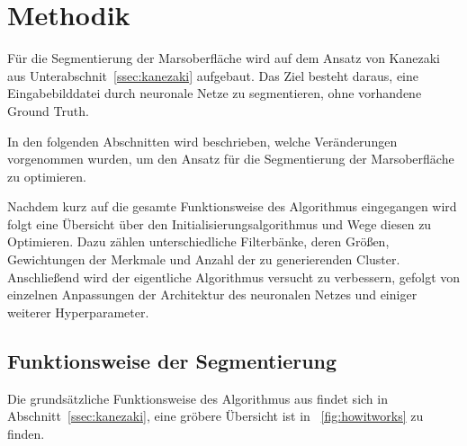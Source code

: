 \chapter{Methodik}
\label{chap:methodik}

Für die Segmentierung der Marsoberfläche wird auf dem Ansatz von Kanezaki \etal \cite{kanezaki_18} aus Unterabschnit~\ref{ssec:kanezaki} aufgebaut. Das Ziel besteht daraus, eine Eingabebilddatei durch neuronale Netze zu segmentieren, ohne vorhandene Ground Truth.

In den folgenden Abschnitten wird beschrieben, welche Veränderungen vorgenommen wurden, um den Ansatz für die Segmentierung der Marsoberfläche zu optimieren.

Nachdem kurz auf die gesamte Funktionsweise des Algorithmus eingegangen wird folgt eine Übersicht über den Initialisierungsalgorithmus und Wege diesen zu Optimieren. Dazu zählen \bspw unterschiedliche Filterbänke, deren Größen, Gewichtungen der Merkmale und Anzahl der zu generierenden Cluster. Anschließend wird der eigentliche Algorithmus versucht zu verbessern, gefolgt von einzelnen Anpassungen der Architektur des neuronalen Netzes und einiger weiterer Hyperparameter.

\section{Funktionsweise der Segmentierung}
\label{sec:howitworks}

Die grundsätzliche Funktionsweise des Algorithmus aus \cite{kanezaki_18} findet sich in Abschnitt~\ref{ssec:kanezaki}, eine gröbere Übersicht ist in \figurename~\ref{fig:howitworks} zu finden.

